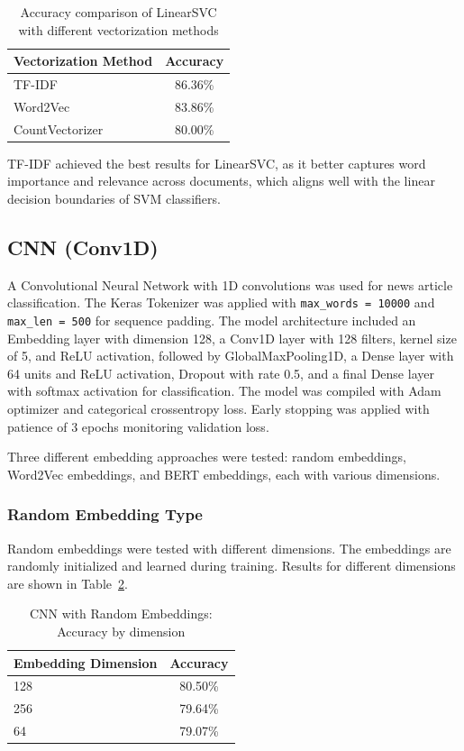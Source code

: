\documentclass[12pt,a4paper]{article}
\begin{document}
\begin{table}[h]
\centering
\begin{tabular}{lc}
\toprule
Vectorization Method & Accuracy \\
\midrule
TF-IDF & 86.36\% \\
Word2Vec & 83.86\% \\
CountVectorizer & 80.00\% \\
\bottomrule
\end{tabular}
\caption{Accuracy comparison of LinearSVC with different vectorization methods}
\label{tab:news_svc_comparison}
\end{table}

TF-IDF achieved the best results for LinearSVC, as it better captures word importance and relevance across documents, which aligns well with the linear decision boundaries of SVM classifiers.

\newpage
\subsection{CNN (Conv1D)}

A Convolutional Neural Network with 1D convolutions was used for news article classification. The Keras Tokenizer was applied with \texttt{max\_words = 10000} and \texttt{max\_len = 500} for sequence padding. The model architecture included an Embedding layer with dimension 128, a Conv1D layer with 128 filters, kernel size of 5, and ReLU activation, followed by GlobalMaxPooling1D, a Dense layer with 64 units and ReLU activation, Dropout with rate 0.5, and a final Dense layer with softmax activation for classification. The model was compiled with Adam optimizer and categorical crossentropy loss. Early stopping was applied with patience of 3 epochs monitoring validation loss.

Three different embedding approaches were tested: random embeddings, Word2Vec embeddings, and BERT embeddings, each with various dimensions.

\subsubsection{Random Embedding Type}

Random embeddings were tested with different dimensions. The embeddings are randomly initialized and learned during training. Results for different dimensions are shown in Table~\ref{tab:news_cnn_random}.

\begin{table}[h]
\centering
\begin{tabular}{lc}
\toprule
Embedding Dimension & Accuracy \\
\midrule
128 & 80.50\% \\
256 & 79.64\% \\
64 & 79.07\% \\
\bottomrule
\end{tabular}
\caption{CNN with Random Embeddings: Accuracy by dimension}
\label{tab:news_cnn_random}
\end{table}
\end{document}
